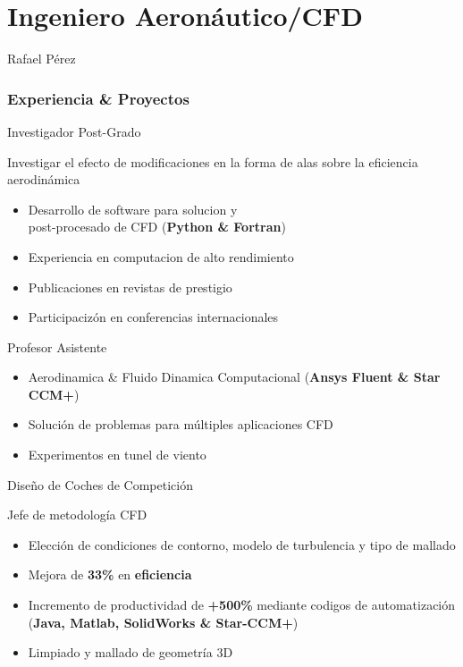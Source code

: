 \documentclass[fontsize=10pt]{tccv_esp}
\begin{document}
\part{Ingeniero Aeron\'autico/CFD}{Rafael P\'erez}

\section{Experiencia \& Proyectos}
\begin{eventlist}
     {Investigador Post-Grado}

Investigar el efecto de modificaciones en la forma de alas sobre la eficiencia aerodin\'amica
\begin{itemize}
	\itemsep -2pt
	\item Desarrollo de software para solucion y \\post-procesado de CFD (\textbf{Python \& Fortran})
	\item Experiencia en computacion de alto rendimiento
	\item Publicaciones en revistas de prestigio
	\item Participaciz\'on en conferencias internacionales
\end{itemize}

	{Profesor Asistente}
\begin{itemize}
	\itemsep -2pt
	\item Aerodinamica \& Fluido Dinamica Computacional (\textbf{Ansys Fluent \& Star
	CCM+})
	\item Soluci\'on de problemas para m\'ultiples aplicaciones CFD 
	\item Experimentos en tunel de viento
\end{itemize}


     {Dise\~{n}o de Coches de Competici\'on}

Jefe de metodolog\'ia CFD 
     \begin{itemize}
	\itemsep -2pt
	\item Elecci\'on de condiciones de contorno, modelo de turbulencia y tipo de mallado
     	\item Mejora de \textbf{33\%} en \textbf{eficiencia}
     	\item Incremento de productividad de \textbf{+500\%} mediante codigos de automatizaci\'on (\textbf{Java, Matlab, SolidWorks \& Star-CCM+})
	\item Limpiado y mallado de geometr\'ia 3D
     \end{itemize}


\end{eventlist}
\end{document}
